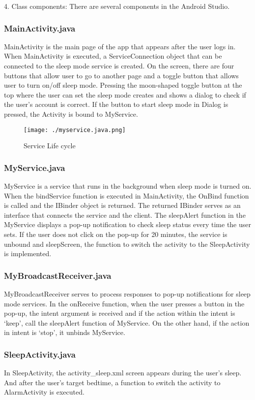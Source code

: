 \documentclass[conference]{IEEEtran}
\begin{document}
\par 4. Class components: There are several components in the Android Studio.
\subsubsection{MainActivity.java}
MainActivity is the main page of the app that appears after the user logs in. When MainActivity is executed, a ServiceConnection object that can be connected to the sleep mode service is created. On the screen, there are four buttons that allow user to go to another page and a toggle button that allows user to turn on/off sleep mode. Pressing the moon-shaped toggle button at the top where the user can set the sleep mode creates and shows a dialog to check if the user's account is correct. If the button to start sleep mode in Dialog is pressed, the Activity is bound to MyService.
\break

\begin{figure}[H]
\texttt{[image: ./myservice.java.png]}
\centering
\caption{Service Life cycle}
\end{figure}

\subsubsection{MyService.java}
MyService is a service that runs in the background when sleep mode is turned on. When the bindService function is executed in MainActivity, the OnBind function is called and the IBinder object is returned. The returned IBinder serves as an interface that connects the service and the client. The sleepAlert function in the MyService displays a pop-up notification to check sleep status every time the user sets. If the user does not click on the pop-up for 20 minutes, the service is unbound and sleepScreen, the function to switch the activity to the SleepActivity is implemented.
\break
\subsubsection{MyBroadcastReceiver.java}
MyBroadcastReceiver serves to process responses to pop-up notifications for sleep mode services. In the onReceive function, when the user presses a button in the pop-up, the intent argument is received and if the action within the intent is ‘keep', call the sleepAlert function of MyService. On the other hand, if the action in intent is ‘stop', it unbinds MyService.
\break
\subsubsection{SleepActivity.java}
In SleepActivity, the activity\_sleep.xml screen appears during the user's sleep. And after the user's target bedtime, a function to switch the activity to AlarmActivity is executed.
\break
\end{document}
